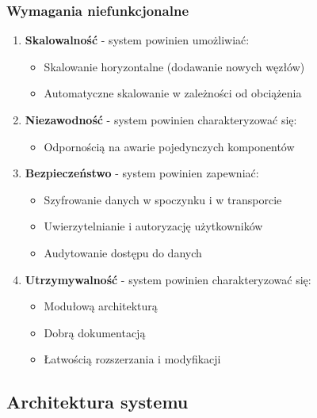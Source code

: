 \subsubsection{Wymagania niefunkcjonalne}
\label{subsubsec:wymagania_niefunkcjonalne}

\begin{enumerate}
    
    \item \textbf{Skalowalność} - system powinien umożliwiać:
    \begin{itemize}
        \item Skalowanie horyzontalne (dodawanie nowych węzłów)
        \item Automatyczne skalowanie w zależności od obciążenia
    \end{itemize}
    
    \item \textbf{Niezawodność} - system powinien charakteryzować się:
    \begin{itemize}
        \item Odpornością na awarie pojedynczych komponentów
    \end{itemize}
    
    \item \textbf{Bezpieczeństwo} - system powinien zapewniać:
    \begin{itemize}
        \item Szyfrowanie danych w spoczynku i w transporcie
        \item Uwierzytelnianie i autoryzację użytkowników
        \item Audytowanie dostępu do danych
    \end{itemize}
    
    \item \textbf{Utrzymywalność} - system powinien charakteryzować się:
    \begin{itemize}
        \item Modułową architekturą
        \item Dobrą dokumentacją
        \item Łatwością rozszerzania i modyfikacji
    \end{itemize}
\end{enumerate}

\subsection{Architektura systemu}
\label{subsec:architektura}

